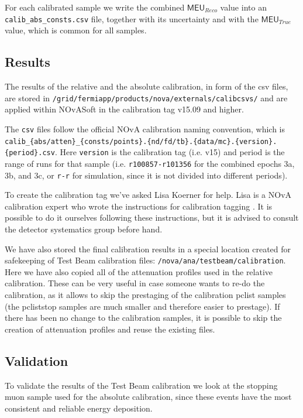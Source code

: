 For each calibrated sample we write the combined $\textsf{MEU}_{Reco}$ value into an \texttt{calib\_abs\_consts.csv} file, together with its uncertainty and with the $\textsf{MEU}_{True}$ value, which is common for all samples.

\subsection{Results}
The results of the relative and the absolute calibration, in form of the csv files, are stored in \texttt{/grid/fermiapp/products/nova/externals/calibcsvs/} and are applied within NOvASoft in the calibration tag v15.09 and higher.

The \texttt{csv} files follow the official NOvA calibration naming convention, which is \\\texttt{calib\_\{abs/atten\}\_\{consts/points\}.\{nd/fd/tb\}.\{data/mc\}.\{version\}.\{period\}.csv}. Here \texttt{version} is the calibration tag (i.e. v15) and period is the range of runs for that sample (i.e. \texttt{r100857-r101356} for the combined epochs 3a, 3b, and 3c, or \texttt{r-r} for simulation, since it is not divided into different periods).

To create the calibration tag we've asked Lisa Koerner for help. Lisa is a NOvA calibration expert who wrote the instructions for calibration tagging \cite{NOVA-doc-59268}. It is possible to do it ourselves following these instructions, but it is advised to consult the detector systematics group before hand.

We have also stored the final calibration results in a special location created for safekeeping of Test Beam calibration files: \texttt{/nova/ana/testbeam/calibration}. Here we have also copied all of the attenuation profiles used in the relative calibration. These can be very useful in case someone wants to re-do the calibration, as it allows to skip the prestaging of the calibration pclist samples (the pcliststop samples are much smaller and therefore easier to prestage). If there has been no change to the calibration samples, it is possible to skip the creation of attenuation profiles and reuse the existing files.

\subsection{Validation}
To validate the results of the Test Beam calibration we look at the stopping muon sample used for the absolute calibration, since these events have the most consistent and reliable energy deposition.

